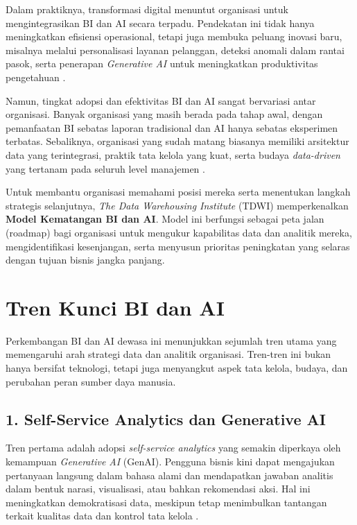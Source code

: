 Dalam praktiknya, transformasi digital menuntut organisasi untuk mengintegrasikan BI dan AI secara terpadu. 
Pendekatan ini tidak hanya meningkatkan efisiensi operasional, tetapi juga membuka peluang inovasi baru, 
misalnya melalui personalisasi layanan pelanggan, deteksi anomali dalam rantai pasok, serta penerapan \textit{Generative AI} 
untuk meningkatkan produktivitas pengetahuan \cite{fernandez2020, lim2023adoption}.  

Namun, tingkat adopsi dan efektivitas BI dan AI sangat bervariasi antar organisasi. Banyak organisasi yang masih berada 
pada tahap awal, dengan pemanfaatan BI sebatas laporan tradisional dan AI hanya sebatas eksperimen terbatas. 
Sebaliknya, organisasi yang sudah matang biasanya memiliki arsitektur data yang terintegrasi, praktik tata kelola yang 
kuat, serta budaya \textit{data-driven} yang tertanam pada seluruh level manajemen \cite{liao2021business, mukherjee2022comparative}.  

Untuk membantu organisasi memahami posisi mereka serta menentukan langkah strategis selanjutnya, 
\textit{The Data Warehousing Institute} (TDWI) memperkenalkan \textbf{Model Kematangan BI dan AI}. 
Model ini berfungsi sebagai peta jalan (roadmap) bagi organisasi untuk mengukur kapabilitas data dan analitik mereka, 
mengidentifikasi kesenjangan, serta menyusun prioritas peningkatan yang selaras dengan tujuan bisnis jangka panjang.

\section{Tren Kunci BI dan AI}

Perkembangan BI dan AI dewasa ini menunjukkan sejumlah tren utama yang memengaruhi arah strategi data dan analitik 
organisasi. Tren-tren ini bukan hanya bersifat teknologi, tetapi juga menyangkut aspek tata kelola, budaya, dan 
perubahan peran sumber daya manusia.

\subsection*{1. Self-Service Analytics dan Generative AI}
Tren pertama adalah adopsi \textit{self-service analytics} yang semakin diperkaya oleh kemampuan 
\textit{Generative AI} (GenAI). Pengguna bisnis kini dapat mengajukan pertanyaan langsung dalam bahasa alami 
dan mendapatkan jawaban analitis dalam bentuk narasi, visualisasi, atau bahkan rekomendasi aksi. Hal ini 
meningkatkan demokratisasi data, meskipun tetap menimbulkan tantangan terkait kualitas data dan kontrol tata kelola 
\cite{imhoff2014ssbi, chen2021aibi}.  

